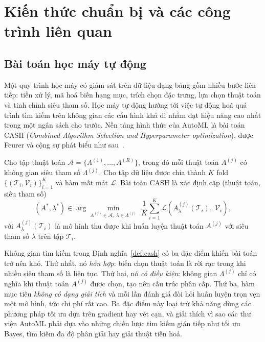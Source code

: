 \chapter{Kiến thức chuẩn bị và các công trình liên quan}
\label{ch:cosoly}

\section{Bài toán học máy tự động}
\label{sec:automl}
Một quy trình học máy có giám sát trên dữ liệu dạng bảng gồm nhiều bước liên
tiếp: tiền xử lý, mã hoá biến hạng mục, trích chọn đặc trưng, lựa chọn thuật toán
và tinh chỉnh siêu tham số. Học máy tự động hướng tới việc tự động hoá quá trình
tìm kiếm trên không gian các cấu hình khả dĩ nhằm đạt hiệu năng cao nhất trong
một ngân sách cho trước. Nền tảng hình thức của AutoML là bài toán CASH
(\textit{Combined Algorithm Selection and Hyperparameter optimization}), được
Feurer và cộng sự phát biểu như sau~\cite{feurer2015autosklearn}.

\begin{dinhnghia}
\label{def:cash}
Cho tập thuật toán $\mathcal{A} = \{A^{(1)}, \dots, A^{(R)}\}$, trong đó mỗi
thuật toán $A^{(j)}$ có không gian siêu tham số $\Lambda^{(j)}$. Cho tập dữ liệu
được chia thành $K$ fold $\{(\mathcal{T}_i, \mathcal{V}_i)\}_{i=1}^{K}$ và hàm mất
mát $\mathcal{L}$. Bài toán CASH là xác định cặp (thuật toán, siêu tham số)
\[
    (A^{\ast}, \lambda^{\ast}) \in
    \arg\min_{A^{(j)}\in\mathcal{A},\; \lambda\in\Lambda^{(j)}}\;
    \frac{1}{K}\sum_{i=1}^{K}
    \mathcal{L}\!\left(A^{(j)}_{\lambda}(\mathcal{T}_i),\; \mathcal{V}_i\right),
\]
với $A^{(j)}_{\lambda}(\mathcal{T}_i)$ là mô hình thu được khi huấn luyện thuật
toán $A^{(j)}$ với siêu tham số $\lambda$ trên tập $\mathcal{T}_i$.
\end{dinhnghia}

\begin{nhanxet}
\label{nx:cash}
Không gian tìm kiếm trong Định nghĩa~\ref{def:cash} có ba đặc điểm khiến bài toán
trở nên khó. Thứ nhất, nó \emph{hỗn hợp}: biến chọn thuật toán là rời rạc trong
khi nhiều siêu tham số là liên tục. Thứ hai, nó \emph{có điều kiện}: không gian
$\Lambda^{(j)}$ chỉ có nghĩa khi thuật toán $A^{(j)}$ được chọn, tạo nên cấu trúc
phân cấp. Thứ ba, hàm mục tiêu \emph{không có dạng giải tích} và mỗi lần đánh giá
đòi hỏi huấn luyện trọn vẹn một mô hình, tức chi phí rất cao. Ba đặc điểm này loại
trừ khả năng dùng các phương pháp tối ưu dựa trên gradient hay vét cạn, và giải
thích vì sao các thư viện AutoML phải dựa vào những chiến lược tìm kiếm gián tiếp
như tối ưu Bayes, tìm kiếm đa độ phân giải hay giải thuật tiến hoá.
\end{nhanxet}

